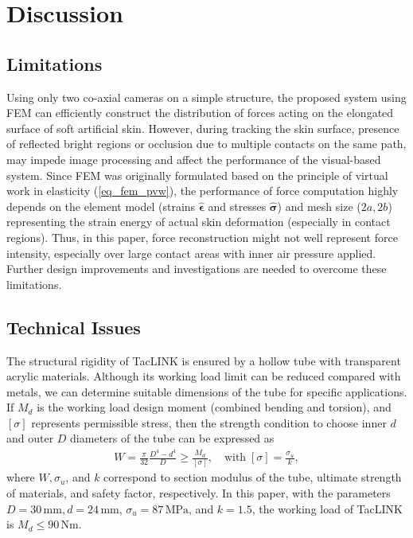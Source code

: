 \documentclass[10pt,letterpaper,journal,final,twoside,twocolumn,nofonttune]{IEEEtran}
\begin{document}
\section{Discussion}
\subsection{Limitations}
Using only two co-axial cameras on a simple structure, the proposed system using FEM can efficiently construct the distribution of forces acting on the elongated surface of soft artificial skin. However, during tracking the skin surface,  presence of reflected bright regions or occlusion due to multiple contacts on the same path, may impede image processing and affect the performance of the visual-based system. Since FEM was originally formulated based on the principle of virtual work in elasticity (\ref{eq_fem_pvw}), the performance of force computation highly depends on the element model (strains $\hat{\bm{\epsilon}}$ and stresses $\hat{\bm{\sigma}}$) and mesh size ($2a,2b$) representing the strain energy of actual skin deformation (especially in contact regions). Thus, in this paper, force reconstruction might not well represent force intensity, especially over large contact areas with inner air pressure applied. Further design improvements and investigations are needed to overcome these limitations.
\subsection{Technical Issues}
The structural rigidity of TacLINK is ensured by a hollow tube with transparent acrylic materials. Although its working load limit can be reduced compared with metals, we can determine suitable dimensions of the tube for specific applications. If  $M_d$ is the working load design moment (combined bending and torsion), and $[\sigma]$ represents permissible stress, then the strength condition to choose inner $d$ and outer $D$ diameters of the tube can be expressed as \cite{Belyaev} 
\begin{equation}
\begin{aligned} 
W=\frac{\pi}{32}\frac{D^4-d^4}{D}  \geq \frac{M_d}{[\sigma]}, \quad \text{with}\; [\sigma]=\frac{\sigma_u}{k},
\end{aligned}
\end{equation}
where $W, \sigma_u$, and $k$ correspond to section modulus of the tube, ultimate strength of materials, and safety factor, respectively. In this paper, with the parameters $D=30\,\text{mm}, d=24\,\text{mm}$, $\sigma_u=87\,\text{MPa}$, and $k=1.5$, the working load of TacLINK is $M_d\leq 90\,\text{Nm}$.
\end{document}

